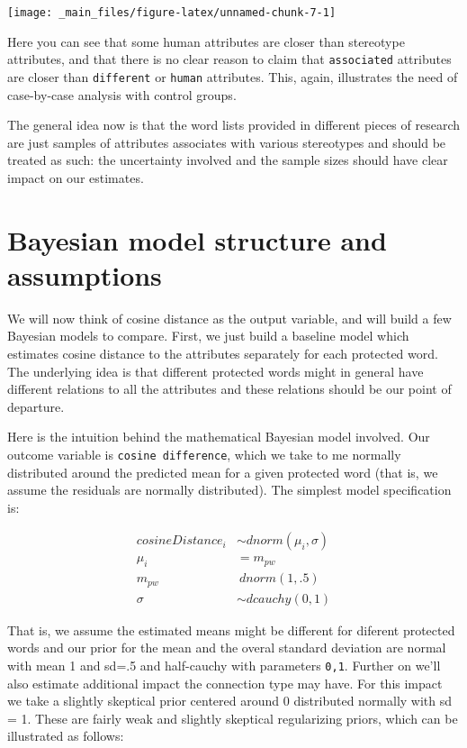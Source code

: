 \documentclass[
  12pt,
]{book}
\begin{document}
\begin{center}\texttt{[image: \_main\_files/figure-latex/unnamed-chunk-7-1]} \end{center}
\normalsize

\noindent Here you can see that some human attributes are closer than stereotype attributes, and that there is no clear reason to claim that \texttt{associated} attributes are closer than \texttt{different} or \texttt{human} attributes. This, again, illustrates the need of case-by-case analysis with control groups.

The general idea now is that the word lists provided in different pieces of research are just samples of attributes associates with various stereotypes and should be treated as such: the uncertainty involved and the sample sizes should have clear impact on our estimates.

\hypertarget{bayesian-model-structure-and-assumptions}{%
\section{Bayesian model structure and assumptions}\label{bayesian-model-structure-and-assumptions}}

We will now think of cosine distance as the output variable, and
will build a few Bayesian models to compare. First, we just build a baseline model which estimates cosine distance to the attributes separately for each protected word. The underlying idea is that different protected words might in general have different relations to all the attributes and these relations should be our point of departure.

Here is the intuition behind the mathematical Bayesian model involved. Our outcome variable is \texttt{cosine\ difference}, which we take to me normally distributed around the predicted mean for a given protected word (that is, we assume the residuals are normally distributed). The simplest model specification is:

\begin{align}
cosineDistance_i  & \sim dnorm(\mu_i, \sigma) \\
\mu_i & = m_{pw} \\
m_{pw} & ~ dnorm(1,.5) \\
\sigma &\sim  dcauchy(0,1)
\end{align}

That is, we assume the estimated means might be different for diferent protected words and our prior for the mean and the overal standard deviation are normal with mean 1 and sd=.5 and half-cauchy with parameters \texttt{0,1}. Further on we'll also estimate additional impact the connection type may have. For this impact we take a slightly skeptical prior centered around 0 distributed normally with sd = 1. These are fairly weak and slightly skeptical regularizing priors, which can be illustrated as follows:
\end{document}
